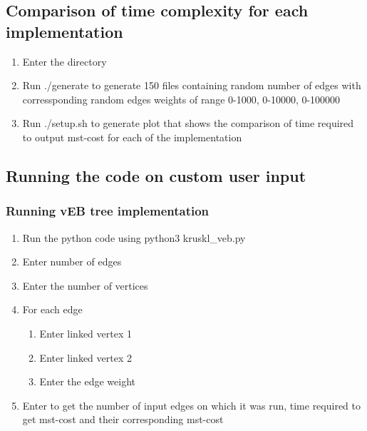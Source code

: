 \documentclass{article}
\begin{document}
\subsection{Comparison of time complexity for each implementation}
\begin{enumerate}
        \item Enter the directory
        \item Run ./generate to generate 150 files containing random          number of edges with corressponding random edges              weights of range 0-1000, 0-10000, 0-100000
        \item Run ./setup.sh to generate plot that shows the comparison of time required to output mst-cost for each of the implementation 
\end{enumerate}
\subsection{Running the code on custom user input}
    \subsubsection{Running vEB tree implementation}
    \begin{enumerate}
        \item Run the python code using python3 kruskl\_veb.py
        \item Enter number of edges
        \item Enter the number of vertices
        \item For each edge
        \begin{enumerate}
        \item Enter linked vertex 1
        \item Enter linked vertex 2
        \item Enter the edge weight
        \end{enumerate}
        \item Enter to get the number of input edges on which it was run, time required to get mst-cost and their corresponding mst-cost
    \end{enumerate}
\end{document}

